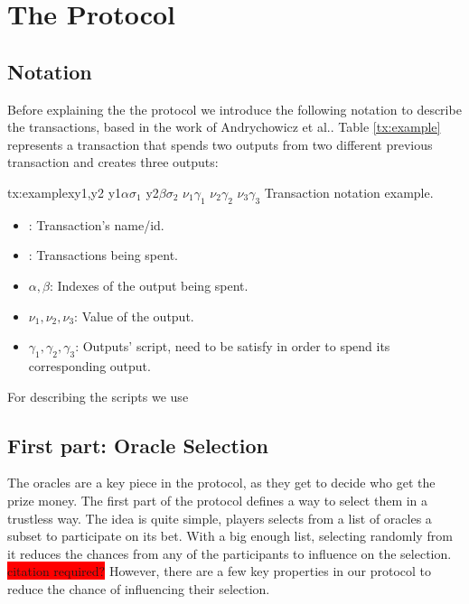 \section{The Protocol}
\subsection{Notation}
Before explaining the the protocol we introduce the following notation to
  describe the transactions, based in the work of Andrychowicz et
  al.\cite{andrychowicz2014secure}.
Table \ref{tx:example} represents a transaction that spends two outputs from
  two different previous transaction and creates three outputs:

  \transaction
    {tx:example}{x}{y1,y2}
      {y1}{$\alpha$}{$\sigma_1$}
      {y2}{$\beta$}{$\sigma_2$}
      \stopinputs
      {$\nu_1$}{$\gamma_1$}
      {$\nu_2$}{$\gamma_2$}
      {$\nu_3$}{$\gamma_3$}
      \stopoutputs
      {Transaction notation example.}

\begin{itemize}
    \item {}: Transaction's name/id.
    \item {}: Transactions being spent.
    \item $\alpha,\beta$: Indexes of the output being spent.
    \item $\nu_1,\nu_2,\nu_3$: Value of the output.
    \item $\gamma_1, \gamma_2, \gamma_3$: Outputs' script, need to be satisfy
                                          in order to spend its corresponding
                                          output.
\end{itemize}

For describing the scripts we use

%
\subsection{First part: Oracle Selection}

The oracles are a key piece in the protocol, as they get to decide who get
  the prize money.
The first part of the protocol defines a way to select them in a trustless
  way.
The idea is quite simple, players selects from a list of oracles a subset
  to participate on its bet.
With a big enough list, selecting randomly from it reduces the
  chances from any of the participants to influence on the selection.
\colorbox{red}{citation required?}
However, there are a few key properties in our protocol to reduce the chance
  of influencing their selection.

